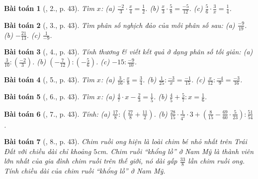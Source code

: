 \documentclass{article}
\newtheorem{baitoan}{Bài toán}
\begin{document}
\begin{baitoan}[\cite{SGK_Toan_6_Canh_Dieu_tap_2}, 2., p. 43]
	Tìm $x$: (a) $\frac{-2}{3}\cdot\frac{x}{4} = \frac{1}{2}$. (b) $\frac{x}{3}\cdot\frac{5}{8} = \frac{-5}{12}$. (c) $\frac{5}{6}\cdot\frac{3}{x} = \frac{1}{4}$.
\end{baitoan}

\begin{baitoan}[\cite{SGK_Toan_6_Canh_Dieu_tap_2}, 3., p. 43]
	Tìm phân số nghịch đảo của mỗi phân số sau: (a) $\frac{-9}{19}$. (b) $-\frac{21}{13}$. (c) $\frac{1}{-9}$.
\end{baitoan}

\begin{baitoan}[\cite{SGK_Toan_6_Canh_Dieu_tap_2}, 4., p. 43]
	Tính thương \& viết kết quả ở dạng phân số tối giản: (a) $\frac{3}{10}:\left(\frac{-2}{3}\right)$. (b) $\left(-\frac{7}{12}\right):\left(-\frac{5}{6}\right)$. (c) $-15:\frac{-9}{10}$.
\end{baitoan}

\begin{baitoan}[\cite{SGK_Toan_6_Canh_Dieu_tap_2}, 5., p. 43]
	Tìm $x$: (a) $\frac{3}{16}:\frac{x}{8} = \frac{3}{4}$. (b) $\frac{1}{25}:\frac{-3}{x} = \frac{-1}{15}$. (c) $\frac{x}{12}:\frac{-4}{9} = \frac{-3}{16}$.
\end{baitoan}

\begin{baitoan}[\cite{SGK_Toan_6_Canh_Dieu_tap_2}, 6., p. 43]
	Tìm $x$: (a) $\frac{4}{7}\cdot x - \frac{2}{3} = \frac{1}{5}$. (b) $\frac{4}{5} + \frac{5}{7}:x = \frac{1}{6}$.
\end{baitoan}

\begin{baitoan}[\cite{SGK_Toan_6_Canh_Dieu_tap_2}, 7., p. 43]
	Tính: (a) $\frac{17}{8}:\left(\frac{27}{8} + \frac{11}{2}\right)$. (b) $\frac{28}{15}\cdot\frac{1}{4^2}\cdot3 + \left(\frac{8}{15} - \frac{69}{60}\cdot\frac{5}{23}\right):\frac{51}{54}$.
\end{baitoan}

\begin{baitoan}[\cite{SGK_Toan_6_Canh_Dieu_tap_2}, 8., p. 43]
	Chim ruồi ong hiện là loài chim bé nhỏ nhất trên Trái Đất với chiều dài chỉ khoảng $5$\emph{cm}. Chim ruồi ``khổng lồ'' ở Nam Mỹ là thành viên lớn nhất của gia đình chim ruồi trên thế giới, nó dài gấp $\frac{33}{8}$ lần chim ruồi ong. Tính chiều dài của chim ruồi ``khổng lồ'' ở Nam Mỹ.
\end{baitoan}

\end{document}
